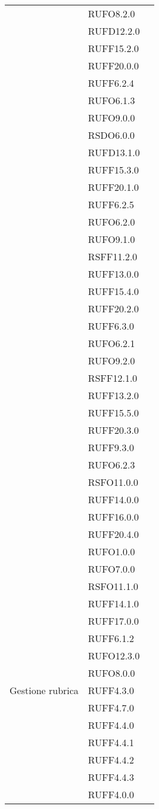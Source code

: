 \begin{center}
\begin{longtable}{lp{}l}
 & RUFO8.2.0 \\
 & RUFD12.2.0 \\
 & RUFF15.2.0 \\
 & RUFF20.0.0 \\
 & RUFF6.2.4 \\
 & RUFO6.1.3 \\
 & RUFO9.0.0 \\
 & RSDO6.0.0 \\
 & RUFD13.1.0 \\
 & RUFF15.3.0 \\
 & RUFF20.1.0 \\
 & RUFF6.2.5 \\
 & RUFO6.2.0 \\
 & RUFO9.1.0 \\
 & RSFF11.2.0 \\
 & RUFF13.0.0 \\
 & RUFF15.4.0 \\
 & RUFF20.2.0 \\
 & RUFF6.3.0 \\
 & RUFO6.2.1 \\
 & RUFO9.2.0 \\
 & RSFF12.1.0 \\
 & RUFF13.2.0 \\
 & RUFF15.5.0 \\
 & RUFF20.3.0 \\
 & RUFF9.3.0 \\
 & RUFO6.2.3 \\
 & RSFO11.0.0 \\
 & RUFF14.0.0 \\
 & RUFF16.0.0 \\
 & RUFF20.4.0 \\
 & RUFO1.0.0 \\
 & RUFO7.0.0 \\
 & RSFO11.1.0 \\
 & RUFF14.1.0 \\
 & RUFF17.0.0 \\
 & RUFF6.1.2 \\
 & RUFO12.3.0 \\
 & RUFO8.0.0 \\
Gestione rubrica & RUFF4.3.0 \\
 & RUFF4.7.0 \\
 & RUFF4.4.0 \\
 & RUFF4.4.1 \\
 & RUFF4.4.2 \\
 & RUFF4.4.3 \\
 & RUFF4.0.0 \\

\end{longtable}
\end{center}
